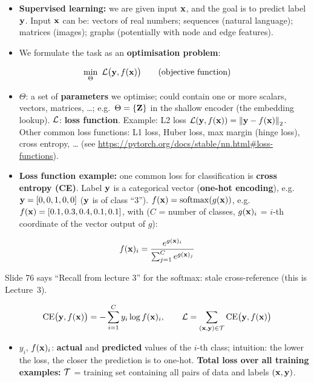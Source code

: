 \begin{itemize}
  \item \textbf{Supervised learning:} we are given input $\mathbf{x}$, and the goal is
    to predict label $\mathbf{y}$. Input $\mathbf{x}$ can be: vectors of real numbers;
    sequences (natural language); matrices (images); graphs (potentially with
    node and edge features).
  \item We formulate the task as an \textbf{optimisation problem}:
\end{itemize}
\begin{equation}\label{eq:lec03-objective}
  \min_{\Theta}\ \mathcal{L}\bigl(\mathbf{y}, f(\mathbf{x})\bigr)\qquad\text{(objective function)}
\end{equation}
\begin{itemize}
  \item $\Theta$: a set of \textbf{parameters} we optimise; could contain one or
    more scalars, vectors, matrices, \dots; e.g.\ $\Theta=\{\mathbf{Z}\}$ in the shallow
    encoder (the embedding lookup). $\mathcal{L}$: \textbf{loss function}. Example: L2 loss
    $\mathcal{L}(\mathbf{y},f(\mathbf{x}))=\left\lVert \mathbf{y}-f(\mathbf{x}) \right\rVert_2$. Other common loss functions: L1
    loss, Huber loss, max margin (hinge loss), cross entropy, \dots{} (see
    \url{https://pytorch.org/docs/stable/nn.html\#loss-functions}).
  \item \textbf{Loss function example:} one common loss for classification is
    \textbf{cross entropy (CE)}. Label $\mathbf{y}$ is a categorical vector
    (\textbf{one-hot encoding}), e.g.\ $\mathbf{y}=[0,0,1,0,0]$ ($\mathbf{y}$ is of class
    ``3''). $f(\mathbf{x})=\operatorname{softmax}(g(\mathbf{x}))$, e.g.\ $f(\mathbf{x})=[0.1,0.3,0.4,0.1,0.1]$, with
    ($C$ = number of classes, $g(\mathbf{x})_i$ = $i$-th coordinate of the vector
    output of $g$):
\end{itemize}
\begin{equation}\label{eq:lec03-softmax}
  f(\mathbf{x})_i = \frac{e^{g(\mathbf{x})_i}}{\sum_{j=1}^{C} e^{g(\mathbf{x})_j}}
\end{equation}
\begin{caution}
  Slide 76 says ``Recall from lecture 3'' for the softmax: stale
  cross-reference (this is Lecture~3).
\end{caution}
\begin{equation}\label{eq:lec03-ce}
  \mathrm{CE}\bigl(\mathbf{y},f(\mathbf{x})\bigr) = -\sum_{i=1}^{C} y_i\log f(\mathbf{x})_i ,
  \qquad
  \mathcal{L} = \sum_{(\mathbf{x},\mathbf{y})\in\mathcal{T}}\mathrm{CE}\bigl(\mathbf{y},f(\mathbf{x})\bigr)
\end{equation}
\begin{itemize}
  \item $y_i$, $f(\mathbf{x})_i$: \textbf{actual} and \textbf{predicted} values of the
    $i$-th class; intuition: the lower the loss, the closer the prediction is
    to one-hot. \textbf{Total loss over all training examples:} $\mathcal{T}$ =
    training set containing all pairs of data and labels $(\mathbf{x},\mathbf{y})$.
\end{itemize}

